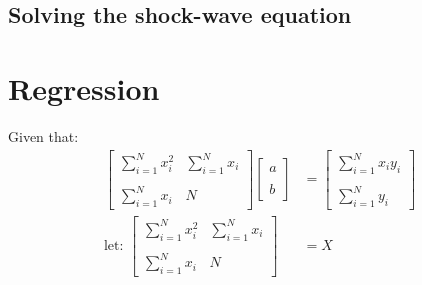 \documentclass[10pt, twocolumn]{article}
\begin{document}
	\subsection{Solving the shock-wave equation}


\section{Regression}
Given that:
\begin{align*}
	\begin{bmatrix}
		\sum_{i=1}^{N}x_i^2 	& 	\sum_{i=1}^{N}x_i\\\\
		\sum_{i=1}^{N}x_i 		&	N
	\end{bmatrix}
	\begin{bmatrix}
	a\\\\
	b
	\end{bmatrix}
	&= 
	\begin{bmatrix}
		\sum_{i=1}^{N}x_iy_i\\\\
		\sum_{i=1}^{N}y_i
	\end{bmatrix}\\
	\text{let: }
	\begin{bmatrix}
		\sum_{i=1}^{N}x_i^2 	& 	\sum_{i=1}^{N}x_i\\\\
		\sum_{i=1}^{N}x_i 		&	N
	\end{bmatrix}
	&= X\\
\end{align*}
\end{document}
